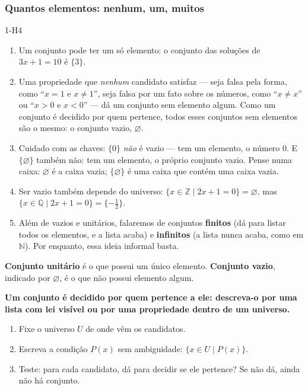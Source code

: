 \subsubsection{Quantos elementos: nenhum, um, muitos}
\begin{construcao}{1-H4}
\begin{enumerate}[label=(\arabic*)]
  \item Um conjunto pode ter um só elemento: o conjunto das soluções de $3x+1=10$ é $\{3\}$.
  \item Uma propriedade que \emph{nenhum} candidato satisfaz — seja falsa pela forma, como \enquote{$x=1$ e $x\neq1$}, seja falsa por um fato sobre os números, como \enquote{$x\neq x$} ou \enquote{$x>0$ e $x<0$} — dá um conjunto sem elemento algum. Como um conjunto é decidido por quem pertence, todos esses conjuntos sem elementos são o mesmo: o conjunto vazio, $\varnothing$.
  \item Cuidado com as chaves: $\{0\}$ \emph{não} é vazio — tem um elemento, o número 0. E $\{\varnothing\}$ também não: tem um elemento, o próprio conjunto vazio. Pense numa caixa: $\varnothing$ é a caixa vazia; $\{\varnothing\}$ é uma caixa que contém uma caixa vazia.
  \item Ser vazio também depende do universo: $\{x\in\mathbb{Z}\mid 2x+1=0\}=\varnothing$, mas $\{x\in\mathbb{Q}\mid 2x+1=0\}=\{-\tfrac12\}$.
  \item Além de vazios e unitários, falaremos de conjuntos \textbf{finitos} (dá para listar todos os elementos, e a lista acaba) e \textbf{infinitos} (a lista nunca acaba, como em $\mathbb{N}$). Por enquanto, essa ideia informal basta.
\end{enumerate}
\end{construcao}

\begin{definicao}
\textbf{Conjunto unitário} é o que possui um único elemento. \textbf{Conjunto vazio}, indicado por $\varnothing$, é o que não possui elemento algum.
\end{definicao}

\begin{paralembrar}\label{lembrar-u1}
\textbf{Um conjunto é decidido por quem pertence a ele: descreva-o por uma lista com lei visível ou por uma propriedade dentro de um universo.}
\begin{enumerate}[label=\arabic*.,leftmargin=1.4em,itemsep=1pt]
  \item Fixe o universo $U$ de onde vêm os candidatos.
  \item Escreva a condição $P(x)$ sem ambiguidade: $\{x\in U\mid P(x)\}$.
  \item Teste: para cada candidato, dá para decidir se ele pertence? Se não dá, ainda não há conjunto.
\end{enumerate}
\end{paralembrar}

